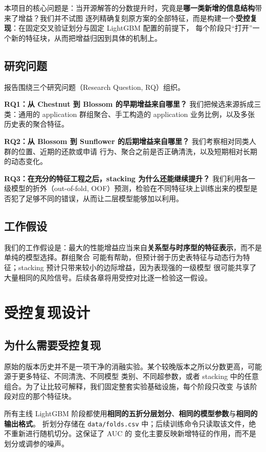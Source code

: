 \documentclass[11pt,UTF8,fontset=windows]{ctexrep}
\begin{document}
本项目的核心问题是：当开源解答的分数提升时，究竟是\textbf{哪一类新增的信息结构}带来了增益？我们并不试图
逐列精确复刻原方案的全部特征，而是构建一个\textbf{受控复现}：在固定交叉验证划分与固定 LightGBM 配置的前提下，
每个阶段只“打开”一个新的特征块，从而把增益归因到具体的机制上。

\section{研究问题}

报告围绕三个研究问题（Research Question, RQ）组织。

\textbf{RQ1：从 Chestnut 到 Blossom 的早期增益来自哪里？} 我们把候选来源拆成三类：通用的 application
群组聚合、手工构造的 application 业务比例，以及多张历史表的聚合特征。

\textbf{RQ2：从 Blossom 到 Sunflower 的后期增益来自哪里？} 我们考察相对同类人群的位置、近期的还款或申请
行为、聚合之前是否正确清洗，以及短期相对长期的动态变化。

\textbf{RQ3：在充分的特征工程之后，stacking 为什么还能继续提升？} 我们利用各一级模型的折外（out-of-fold,
OOF）预测，检验在不同特征块上训练出来的模型是否犯了足够不同的错误，从而让二层模型能够加以利用。

\section{工作假设}

我们的工作假设是：最大的性能增益应当来自\textbf{关系型与时序型的特征表示}，而不是单纯的模型选择。群组聚合
可能有帮助，但预计弱于历史表特征与动态行为特征；stacking 预计只带来较小的边际增益，因为表现强的一级模型
很可能共享了大量相同的风险信号。后续各章将用受控对比逐一检验这一假设。

\chapter{受控复现设计}

\section{为什么需要受控复现}

原始的版本历史并不是一项干净的消融实验。某个较晚版本之所以分数更高，可能源于更多特征、不同清洗、不同模型
类别、不同超参数，或者 stacking 中的任意组合。为了让比较可解释，我们固定整套实验基础设施，每个阶段只改变
与该阶段对应的那个特征块。

所有主线 LightGBM 阶段都使用\textbf{相同的五折分层划分}、\textbf{相同的模型参数}与\textbf{相同的输出格式}。
折划分存储在 \texttt{data/folds.csv} 中；后续训练命令只读取该文件，绝不重新进行随机切分。这保证了 AUC 的
变化主要反映新增特征的作用，而不是划分或调参的噪声。
\end{document}
